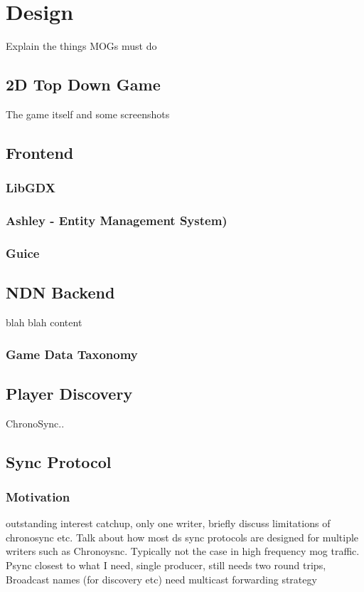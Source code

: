 \chapter{Design}
Explain the things MOGs must do 


\section{2D Top Down Game}
The game itself and some screenshots


\section{Frontend}
\subsection{LibGDX}
\subsection{Ashley - Entity Management System)}
\subsection{Guice}


\section{NDN Backend}
blah blah content

\subsection{Game Data Taxonomy}

\section{Player Discovery}
ChronoSync..


\section{Sync Protocol}


\subsection{Motivation}
outstanding interest catchup, only one writer, briefly discuss limitations of chronosync etc. Talk about how most ds sync protocols are designed for multiple writers such as Chronoysnc. Typically not the case in high frequency mog traffic. Psync closest to what I need, single producer, still needs two round trips, Broadcast names (for discovery etc) need multicast forwarding strategy

